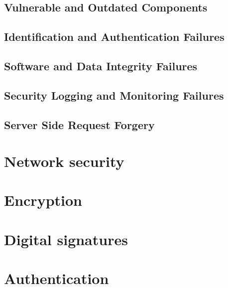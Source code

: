 \subsection{Vulnerable and Outdated Components}

\subsection{Identification and Authentication Failures}

\subsection{Software and Data Integrity Failures}

\subsection{Security Logging and Monitoring Failures}

\subsection{Server Side Request Forgery}

\section{Network security}

\section{Encryption}

\section{Digital signatures}

\section{Authentication}
